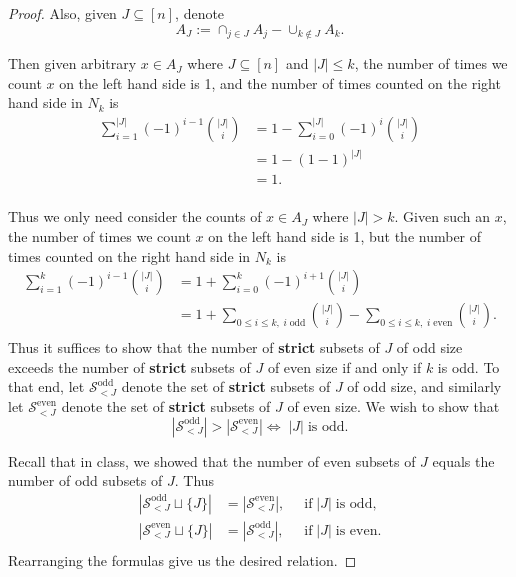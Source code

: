 \documentclass{article}
\begin{document}
\begin{enumerate}[label={\bf Q\arabic*:}]
\begin{proof}
      Also, given $J\subseteq[n]$, denote
      \[A_J:=\cap_{j\in J}A_j -\cup_{k\not\in J}A_k.\]

      Then given arbitrary $x\in A_J$ where $J\subseteq[n]$ and $|J|\leq
      k$, the number of times we count $x$ on the left hand side is 1, and
      the number of times counted on the right hand side in $N_k$ is
      \begin{align*}
        \sum_{i=1}^{|J|} (-1)^{i-1}\binom{|J|}{i} &=1-\sum_{i=0}^{|J|}
          (-1)^{i}\binom{|J|}{i}\\
        &=1-(1-1)^{|J|}\\
        &=1.\\
      \end{align*}

      Thus we only need consider the counts of $x\in A_J$ where $|J|>k$.
      Given such an $x$, the number of times we count $x$ on the left hand
      side is 1, but the number of times counted on the right hand side in
      $N_k$ is
      \begin{align*}
        \sum_{i=1}^{k} (-1)^{i-1}\binom{|J|}{i} &=1+\sum_{i=0}^{k}
          (-1)^{i+1}\binom{|J|}{i}\\
        &=1 +\sum_{0\leq i\leq k,\; i\; \text{odd}} \binom{|J|}{i}
        -\sum_{0\leq i\leq k,\; i\; \text{even}} \binom{|J|}{i}.\\
      \end{align*}
      Thus it suffices to show that the number of \textbf{strict} subsets
      of $J$ of odd size exceeds the number of \textbf{strict} subsets of
      $J$ of even size if and only if $k$ is odd. To that end, let
      $\mathcal{S}_{<J}^{\text{odd}}$ denote the set of \textbf{strict}
      subsets of $J$ of odd size, and similarly let
      $\mathcal{S}_{<J}^{\text{even}}$ denote the set of \textbf{strict}
      subsets of $J$ of even size. We wish to show that
      \[|\mathcal{S}_{<J}^{\text{odd}}|
      >|\mathcal{S}_{<J}^{\text{even}}| \Leftrightarrow\; |J|\; \text{is
      odd}.\]

      Recall that in class, we showed that the number of even subsets of
      $J$ equals the number of odd subsets of $J$. Thus
      \begin{align*}
        |\mathcal{S}_{<J}^{\text{odd}}
          \sqcup\{J\}| &=|\mathcal{S}_{<J}^{\text{even}}|,\;\; &\text{if}\;
          |J|\; \text{is odd},\\
        |\mathcal{S}_{<J}^{\text{even}}
          \sqcup\{J\}| &=|\mathcal{S}_{<J}^{\text{odd}}|,\;\; &\text{if}\;
          |J|\; \text{is even}.\\
      \end{align*}
      Rearranging the formulas give us the desired relation.
    \end{proof}


\end{enumerate}
\end{document}
